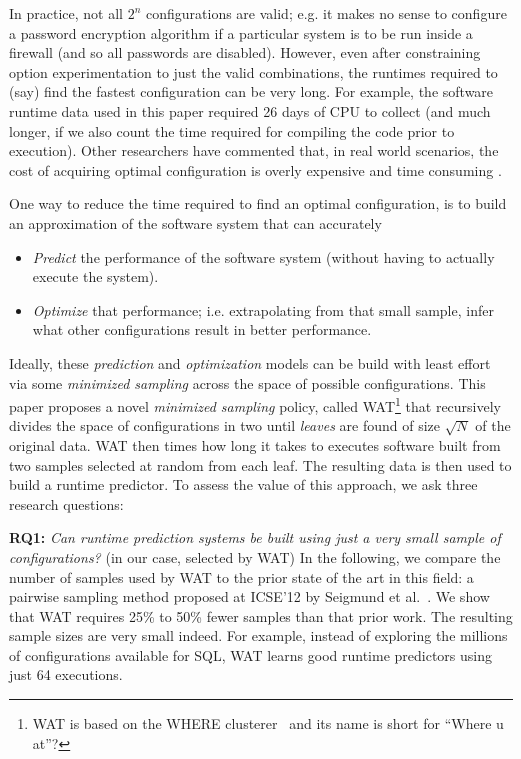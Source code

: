 \documentclass{sig-alternative}
\newcommand{\bi}{\begin{itemize}}%
\newcommand{\ei}{\end{itemize}}
\begin{document}
In practice,  not all $2^n$ configurations are valid; e.g. it makes no sense
 to configure a password encryption algorithm if a particular system is to be run inside a firewall (and so all passwords are disabled).  However, even after constraining option experimentation to just the valid combinations,
 the   runtimes required to (say) find the fastest configuration can be very long. 
 For example, the software runtime data used in this paper required  26 days of CPU to collect (and much longer, if we also count the time required
 for compiling the code prior to execution). 
 Other researchers have commented that,  in 
 real world scenarios, the cost of acquiring optimal configuration is overly expensive and time consuming \cite{weiss2008maximizing}.
 
 
 One way to reduce the time required to find an optimal configuration, is  to build an approximation of the software system that  can accurately 
 \bi
 \item {\em Predict} the  performance  of the software system (without having to actually execute the system). 
 \item {\em Optimize} that performance; i.e. extrapolating from that small sample, infer what other configurations   result in better  performance. 
\ei
Ideally, these {\em prediction} and {\em optimization} models can be build with least effort via  some {\em minimized sampling} across the space of possible configurations.
This paper proposes 
a novel {\em minimized sampling} policy, called   WAT\footnote{WAT is based on the WHERE clusterer~\cite{menzies2013local} and its name is short for ``Where u at''?} that recursively divides the space of configurations in two
until {\em leaves} are found of size $\sqrt{N}$ of the original data.
WAT then times how long it takes to executes software
built from two  samples selected at random from  each leaf. The resulting data is then
used to build a runtime predictor.  To assess the value of this approach, we ask three
research questions:
   
            {\bf RQ1:} {\em Can runtime prediction systems  be built using just a very small sample of configurations?} (in our case,  selected by WAT)
            In the following, we compare the number of samples used by WAT
              to the prior state of the art in this field: a pairwise sampling method proposed at ICSE'12 by Seigmund et al.~\cite{siegmund2012predicting}. 
              We show that WAT requires  25\% to 50\% fewer samples than that  prior
 work. The resulting sample sizes are very small indeed. For example, instead of exploring
 the millions of configurations available for SQL, WAT learns good runtime predictors using
 just 64 executions.
            
\end{document}
